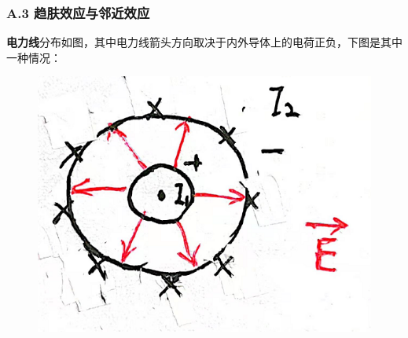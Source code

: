 \documentclass[UTF8]{ctexart}
\begin{document}
\subsubsection*{A.3 趋肤效应与邻近效应}
\textbf{电力线}分布如图，其中电力线箭头方向取决于内外导体上的电荷正负，下图是其中一种情况：
\begin{figure}[H]\begin{center}
    \includegraphics[scale=0.3]{14.PNG}
\end{center}\end{figure}
\end{document}
